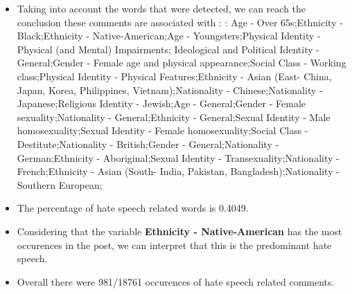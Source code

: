 \documentclass[11pt]{article}
\begin{document}
\begin{itemize}\item Taking into account the words that were detected, we can reach the conclusion these comments are associated with : : Age - Over 65s;Ethnicity - Black;Ethnicity - Native-American;Age - Youngsters;Physical Identity - Physical (and Mental) Impairments; Ideological and Political Identity - General;Gender - Female age and physical appearance;Social Class - Working class;Physical Identity - Physical Features;Ethnicity - Asian (East- China, Japan, Korea, Philippines, Vietnam);Nationality - Chinese;Nationality - Japanese;Religious Identity - Jewish;Age - General;Gender - Female sexuality;Nationality - General;Ethnicity - General;Sexual Identity - Male homosexuality;Sexual Identity - Female homosexuality;Social Class - Destitute;Nationality - British;Gender - General;Nationality - German;Ethnicity - Aboriginal;Sexual Identity - Transexuality;Nationality - French;Ethnicity - Asian (South- India, Pakistan, Bangladesh);Nationality - Southern European;%

\item The percentage of hate speech related words is 0.4049.

\item Considering that the variable \textbf{Ethnicity - Native-American} has the most occurences in the post, we can interpret that this is the predominant hate speech.

\item Overall there were 981/18761 occurences of hate speech related comments.\end{itemize}
\end{document}
